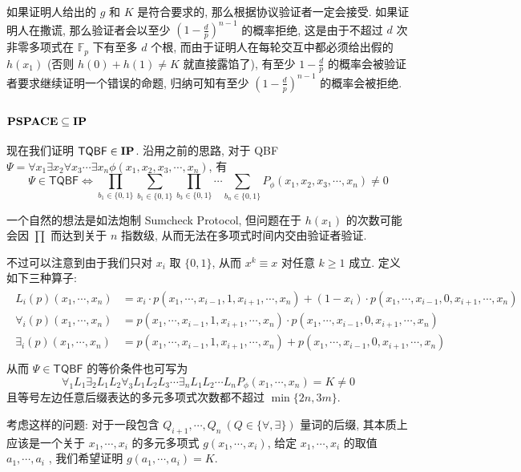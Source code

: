 \documentclass[8pt]{article}
\theoremstyle{compact}
\def\ge{\geqslant}
\def\PSPACE{\textbf{PSPACE}}
\begin{document}
如果证明人给出的 $g$ 和 $K$ 是符合要求的, 那么根据协议验证者一定会接受. 如果证明人在撒谎, 那么验证者会以至少 $\left(1 - \frac dp \right)^{n-1}$ 的概率拒绝, 这是由于不超过 $d$ 次非零多项式在 $\mathbb F_p$ 下有至多 $d$ 个根, 而由于证明人在每轮交互中都必须给出假的 $h(x_1)$ (否则 $h(0) + h(1) \neq K$ 就直接露馅了), 有至少 $1 - \frac dp$ 的概率会被验证者要求继续证明一个错误的命题, 归纳可知有至少 $\left(1 - \frac dp \right)^{n-1}$ 的概率会被拒绝.

\subsubsection{$\PSPACE \subseteq \IP$}
现在我们证明 $\textsf{TQBF} \in \textbf{IP}$. 沿用之前的思路, 对于 QBF $\Psi = \forall x_1\exists x_2\forall x_3 \cdots \exists x_n \phi(x_1, x_2, x_3, \cdots, x_n)$, 有 $$\Psi \in \textsf{TQBF} \Leftrightarrow \prod_{b_1 \in \{0, 1\}} \sum_{b_1 \in \{0, 1\}} \prod_{b_3 \in \{0, 1\}} \cdots \sum_{b_n \in \{0, 1\}} P_{\phi}(x_1, x_2, x_3, \cdots, x_n) \neq 0$$

一个自然的想法是如法炮制 Sumcheck Protocol, 但问题在于 $h(x_1)$ 的次数可能会因 $\prod$ 而达到关于 $n$ 指数级, 从而无法在多项式时间内交由验证者验证.

不过可以注意到由于我们只对 $x_i$ 取 $\{0, 1\}$, 从而 $x^k \equiv x$ 对任意 $k \ge 1$ 成立. 定义如下三种算子: \begin{align*}
	\begin{split}
		L_i(p)(x_1, \cdots, x_n) &= x_i \cdot p(x_1, \cdots, x_{i-1}, 1, x_{i+1}, \cdots, x_n) +(1 - x_i) \cdot p(x_1, \cdots, x_{i-1}, 0, x_{i+1}, \cdots, x_n) \\
		\forall_i(p)(x_1, \cdots, x_n) &= p(x_1, \cdots, x_{i-1}, 1, x_{i+1}, \cdots, x_n) \cdot p(x_1, \cdots, x_{i-1}, 0, x_{i+1}, \cdots, x_n) \\
		\exists_i(p)(x_1, \cdots, x_n) &= p(x_1, \cdots, x_{i-1}, 1, x_{i+1}, \cdots, x_n) + p(x_1, \cdots, x_{i-1}, 0, x_{i+1}, \cdots, x_n) \\
	\end{split}
\end{align*}
从而 $\Psi \in \textsf{TQBF}$ 的等价条件也可写为 $$\forall_1L_1\exists_2L_1L_2\forall_3L_1L_2L_3\cdots \exists_n L_1L_2\cdots L_n P_{\phi}(x_1, \cdots, x_n) = K \neq 0$$
且等号左边任意后缀表达的多元多项式次数都不超过 $\min\{2n,3m\}$.

考虑这样的问题: 对于一段包含 $Q_{i+1}, \cdots, Q_n \ (Q \in \{\forall, \exists\})$ 量词的后缀, 其本质上应该是一个关于 $x_1, \cdots, x_i$ 的多元多项式 $g(x_1, \cdots, x_i)$, 给定 $x_1, \cdots, x_i$ 的取值 $a_1, \cdots, a_i$ , 我们希望证明 $g(a_1, \cdots, a_i) = K$.
\end{document}
